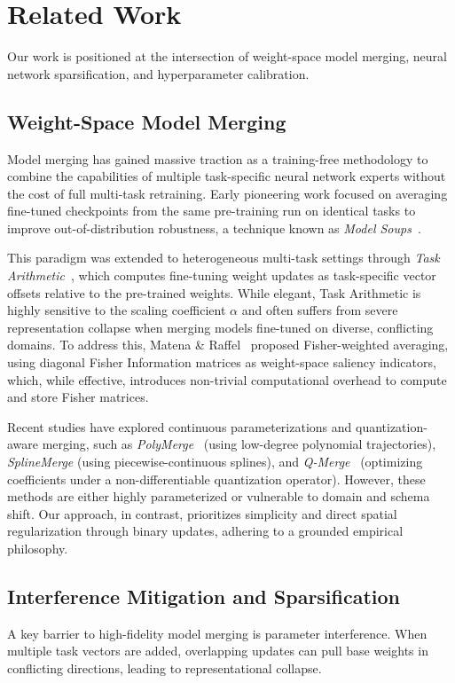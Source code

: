 \section{Related Work}
\label{sec:related_work}

Our work is positioned at the intersection of weight-space model merging, neural network sparsification, and hyperparameter calibration.

\subsection{Weight-Space Model Merging}
Model merging has gained massive traction as a training-free methodology to combine the capabilities of multiple task-specific neural network experts without the cost of full multi-task retraining. Early pioneering work focused on averaging fine-tuned checkpoints from the same pre-training run on identical tasks to improve out-of-distribution robustness, a technique known as \emph{Model Soups}~\cite{wortsman2022model}. 

This paradigm was extended to heterogeneous multi-task settings through \emph{Task Arithmetic}~\cite{ilharco2022editing}, which computes fine-tuning weight updates as task-specific vector offsets relative to the pre-trained weights. While elegant, Task Arithmetic is highly sensitive to the scaling coefficient $\alpha$ and often suffers from severe representation collapse when merging models fine-tuned on diverse, conflicting domains. To address this, Matena \& Raffel~\cite{matena2022merging} proposed Fisher-weighted averaging, using diagonal Fisher Information matrices as weight-space saliency indicators, which, while effective, introduces non-trivial computational overhead to compute and store Fisher matrices.

Recent studies have explored continuous parameterizations and quantization-aware merging, such as \emph{PolyMerge}~\cite{polymerge} (using low-degree polynomial trajectories), \emph{SplineMerge} (using piecewise-continuous splines), and \emph{Q-Merge}~\cite{qmerge} (optimizing coefficients under a non-differentiable quantization operator). However, these methods are either highly parameterized or vulnerable to domain and schema shift. Our approach, in contrast, prioritizes simplicity and direct spatial regularization through binary updates, adhering to a grounded empirical philosophy.

\subsection{Interference Mitigation and Sparsification}
A key barrier to high-fidelity model merging is parameter interference. When multiple task vectors are added, overlapping updates can pull base weights in conflicting directions, leading to representational collapse. 

